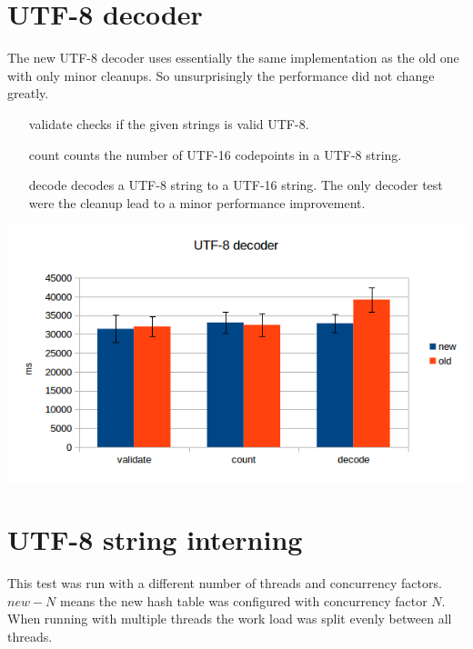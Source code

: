 \documentclass[12pt,a4paper,oneside]{article}
\begin{document}
\section{UTF-8 decoder}
	The new UTF-8 decoder uses essentially the same implementation as the old one with only minor cleanups.
	So unsurprisingly the performance did not change greatly.

	\begin{itemize}
		\item[validate] checks if the given strings is valid UTF-8.
		\item[count]    counts the number of UTF-16 codepoints in a UTF-8 string.
		\item[decode]   decodes a UTF-8 string to a UTF-16 string.
		                The only decoder test were the cleanup lead to a minor performance improvement.
	\end{itemize}

	\includegraphics{utf8-decoder.png}

\section{UTF-8 string interning}
	This test was run with a different number of threads and concurrency factors.
	$new-N$ means the new hash table was configured with concurrency factor $N$.
	When running with multiple threads the work load was split evenly between all threads.
\end{document}
